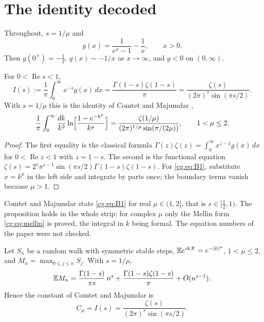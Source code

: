 \section{The identity decoded}\label{cg:sec:decode}

Throughout, $s=1/\mu$ and
\[
g(x)=\frac{1}{e^x-1}-\frac1x,\qquad x>0 .
\]
Then $g(0^+)=-\tfrac12$, $g(x)\sim-1/x$ as $x\to\infty$, and $g<0$ on $(0,\infty)$.

\begin{proposition}\label{cg:prop:mellin}
For $0<\operatorname{Re}s<1$,
\begin{equation}\label{cg:eq:mellin}
I(s):=\frac1\pi\int_0^\infty x^{-s}g(x)\,dx=\frac{\Gamma(1-s)\zeta(1-s)}{\pi}=\frac{\zeta(s)}{(2\pi)^s\sin(\pi s/2)} .
\end{equation}
With $s=1/\mu$ this is the identity of Comtet and Majumdar \cite{ComtetMajumdar05},
\begin{equation}\label{cg:eq:B1}
\frac1\pi\int_0^\infty\frac{dk}{k^2}\ln\Bigl[\frac{1-e^{-k^\mu}}{k^\mu}\Bigr]=\frac{\zeta(1/\mu)}{(2\pi)^{1/\mu}\sin(\pi/(2\mu))},\qquad 1<\mu\le2 .
\end{equation}
\end{proposition}

\begin{proof}
The first equality is the classical formula $\Gamma(z)\zeta(z)=\int_0^\infty x^{z-1}g(x)\,dx$ for $0<\operatorname{Re}z<1$ \cite[Equation 2.7.1]{Titchmarsh} with $z=1-s$. The second is the functional equation $\zeta(s)=2^s\pi^{s-1}\sin(\pi s/2)\Gamma(1-s)\zeta(1-s)$. For \eqref{cg:eq:B1}, substitute $x=k^\mu$ in the left side and integrate by parts once; the boundary terms vanish because $\mu>1$.
\end{proof}

Comtet and Majumdar state \eqref{cg:eq:B1} for real $\mu\in(1,2]$, that is $s\in[\frac12,1)$. The proposition holds in the whole strip; for complex $\mu$ only the Mellin form \eqref{cg:eq:mellin} is proved, the integral in $k$ being formal. The equation numbers of the paper were not checked.

\begin{proposition}\label{cg:prop:spitzer}
Let $S_n$ be a random walk with symmetric stable steps, $\mathbb{E} e^{ikX}=e^{-|k|^\mu}$, $1<\mu\le2$, and $M_n=\max_{0\le j\le n}S_j$. With $s=1/\mu$,
\[
\mathbb{E} M_n=\frac{\Gamma(1-s)}{\pi s}\,n^{s}+\frac{\Gamma(1-s)\zeta(1-s)}{\pi}+O(n^{s-1}).
\]
Hence the constant of Comtet and Majumdar is
\[
C_\mu=I(s)=\frac{\zeta(s)}{(2\pi)^s\sin(\pi s/2)}.
\]
\end{proposition}


